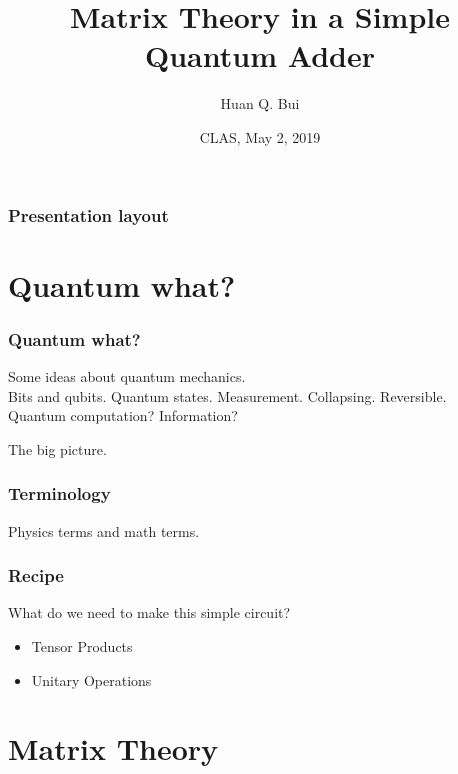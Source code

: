 \documentclass{beamer}
\title{Matrix Theory in a Simple Quantum Adder}
\author[Huan Q. Bui] %
{Huan Q. Bui}
\institute[Colby College] %
{
	
	Matrix Analysis
	\and
	Professor Leo Livshits
}
\date{CLAS, May 2, 2019}
\theoremstyle{definition}
\begin{document}
 
\frame{\titlepage}
 
\begin{frame}
\frametitle{Presentation layout}
\tableofcontents
\end{frame}

\section{Quantum what?}

\begin{frame}
\frametitle{Quantum what?}
Some ideas about quantum mechanics.\\

Bits and qubits. Quantum states. Measurement. Collapsing. Reversible.\\

Quantum computation? Information?

The big picture.
\end{frame}

\begin{frame}
\frametitle{Terminology}

Physics terms and math terms.

\end{frame}


\begin{frame}
\frametitle{Recipe}

What do we need to make this simple circuit?

\begin{itemize}
	\item Tensor Products 
	\item Unitary Operations
\end{itemize}
\end{frame}








\section{Matrix Theory}
\end{document}
